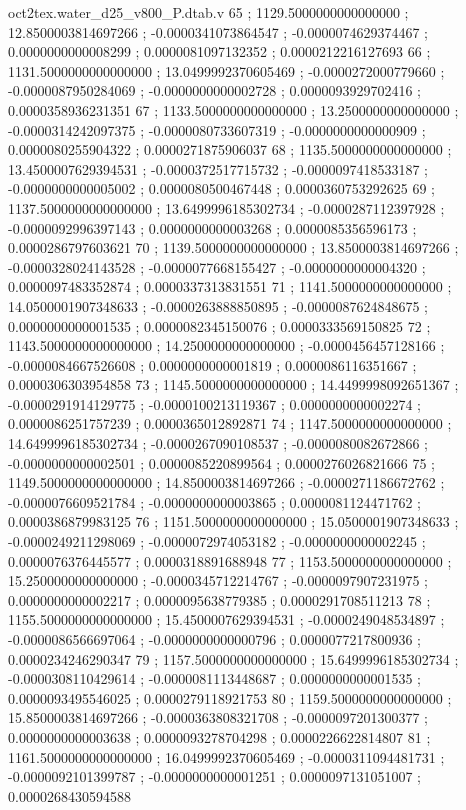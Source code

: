 \begin{filecontents}[overwrite]{oct2tex.water_d25_v800_P.dtab.v}
65 ; 1129.5000000000000000 ; 12.8500003814697266 ; -0.0000341073864547 ; -0.0000074629374467 ; 0.0000000000008299 ; 0.0000081097132352 ; 0.0000212216127693
66 ; 1131.5000000000000000 ; 13.0499992370605469 ; -0.0000272000779660 ; -0.0000087950284069 ; -0.0000000000002728 ; 0.0000093929702416 ; 0.0000358936231351
67 ; 1133.5000000000000000 ; 13.2500000000000000 ; -0.0000314242097375 ; -0.0000080733607319 ; -0.0000000000000909 ; 0.0000080255904322 ; 0.0000271875906037
68 ; 1135.5000000000000000 ; 13.4500007629394531 ; -0.0000372517715732 ; -0.0000097418533187 ; -0.0000000000005002 ; 0.0000080500467448 ; 0.0000360753292625
69 ; 1137.5000000000000000 ; 13.6499996185302734 ; -0.0000287112397928 ; -0.0000092996397143 ; 0.0000000000003268 ; 0.0000085356596173 ; 0.0000286797603621
70 ; 1139.5000000000000000 ; 13.8500003814697266 ; -0.0000328024143528 ; -0.0000077668155427 ; -0.0000000000004320 ; 0.0000097483352874 ; 0.0000337313831551
71 ; 1141.5000000000000000 ; 14.0500001907348633 ; -0.0000263888850895 ; -0.0000087624848675 ; 0.0000000000001535 ; 0.0000082345150076 ; 0.0000333569150825
72 ; 1143.5000000000000000 ; 14.2500000000000000 ; -0.0000456457128166 ; -0.0000084667526608 ; 0.0000000000001819 ; 0.0000086116351667 ; 0.0000306303954858
73 ; 1145.5000000000000000 ; 14.4499998092651367 ; -0.0000291914129775 ; -0.0000100213119367 ; 0.0000000000002274 ; 0.0000086251757239 ; 0.0000365012892871
74 ; 1147.5000000000000000 ; 14.6499996185302734 ; -0.0000267090108537 ; -0.0000080082672866 ; -0.0000000000002501 ; 0.0000085220899564 ; 0.0000276026821666
75 ; 1149.5000000000000000 ; 14.8500003814697266 ; -0.0000271186672762 ; -0.0000076609521784 ; -0.0000000000003865 ; 0.0000081124471762 ; 0.0000386879983125
76 ; 1151.5000000000000000 ; 15.0500001907348633 ; -0.0000249211298069 ; -0.0000072974053182 ; -0.0000000000002245 ; 0.0000076376445577 ; 0.0000318891688948
77 ; 1153.5000000000000000 ; 15.2500000000000000 ; -0.0000345712214767 ; -0.0000097907231975 ; 0.0000000000002217 ; 0.0000095638779385 ; 0.0000291708511213
78 ; 1155.5000000000000000 ; 15.4500007629394531 ; -0.0000249048534897 ; -0.0000086566697064 ; -0.0000000000000796 ; 0.0000077217800936 ; 0.0000234246290347
79 ; 1157.5000000000000000 ; 15.6499996185302734 ; -0.0000308110429614 ; -0.0000081113448687 ; 0.0000000000001535 ; 0.0000093495546025 ; 0.0000279118921753
80 ; 1159.5000000000000000 ; 15.8500003814697266 ; -0.0000363808321708 ; -0.0000097201300377 ; 0.0000000000003638 ; 0.0000093278704298 ; 0.0000226622814807
81 ; 1161.5000000000000000 ; 16.0499992370605469 ; -0.0000311094481731 ; -0.0000092101399787 ; -0.0000000000001251 ; 0.0000097131051007 ; 0.0000268430594588

\end{filecontents}

